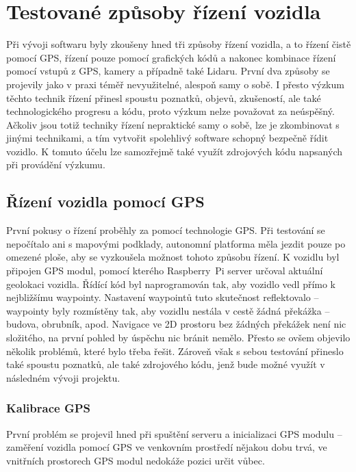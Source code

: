 \documentclass[czech, bachelor]{diploma}
\begin{document}
\chapter{Testované způsoby řízení vozidla} \label{driving-methods}

Při vývoji softwaru byly zkoušeny hned tři způsoby řízení vozidla, a to řízení čistě pomocí GPS, řízení pouze pomocí grafických
kódů a nakonec kombinace řízení pomocí vstupů z GPS, kamery a případně také Lidaru. První dva způsoby se projevily jako v praxi
téměř nevyužitelné, alespoň samy o sobě. I přesto výzkum těchto technik řízení přinesl spoustu poznatků, objevů, zkušeností, ale
také technologického progresu a kódu, proto výzkum nelze považovat za neúspěšný. Ačkoliv jsou totiž techniky řízení nepraktické
samy o sobě, lze je zkombinovat s jinými technikami, a tím vytvořit spolehlivý software schopný bezpečně řídit vozidlo. K tomuto
účelu lze samozřejmě také využít zdrojových kódu napsaných při provádění výzkumu.

\section{Řízení vozidla pomocí GPS} \label{gps-failure}

První pokusy o řízení proběhly za pomocí technologie GPS. Při testování se nepočítalo ani s mapovými podklady, autonomní platforma
měla jezdit pouze po omezené ploše, aby se vyzkoušela možnost tohoto způsobu řízení. K vozidlu byl připojen GPS modul, pomocí
kterého Raspberry~Pi server určoval aktuální geolokaci vozidla. Řídící kód byl naprogramován tak, aby vozidlo vedl přímo
k nejbližšímu waypointy. Nastavení waypointů tuto skutečnost reflektovalo -- waypointy byly rozmístěny tak, aby vozidlu nestála
v cestě žádná překážka -- budova, obrubník, apod. Navigace ve 2D prostoru bez žádných překážek není nic složitého, na první pohled
by úspěchu nic bránit nemělo. Přesto se ovšem objevilo několik problémů, které bylo třeba řešit. Zároveň však s sebou testování
přineslo také spoustu poznatků, ale také zdrojového kódu, jenž bude možné využít v následném vývoji projektu.

\subsection{Kalibrace GPS}

První problém se projevil hned při spuštění serveru a inicializaci GPS modulu -- zaměření vozidla pomocí GPS ve venkovním
prostředí nějakou dobu trvá, ve vnitřních prostorech GPS modul nedokáže pozici určit vůbec.
\end{document}
